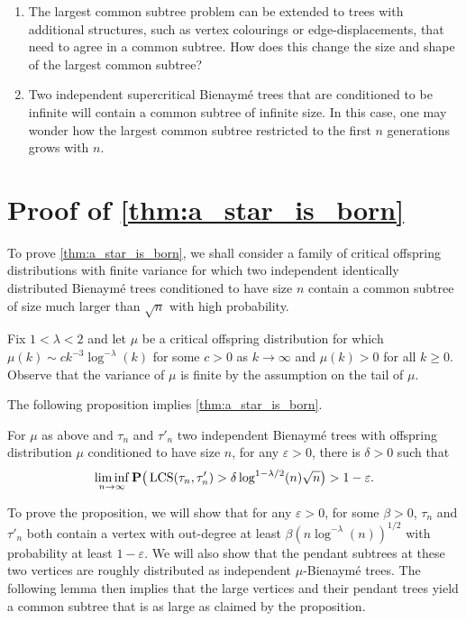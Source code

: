 \documentclass[11pt,reqno]{amsart}
\newcommand{\LCS}{\operatorname{LCS}}
\begin{document}
\begin{enumerate}
    \item The largest common subtree problem can be extended to trees with additional structures, such as vertex colourings or edge-displacements, that need to agree in a common subtree. How does this change the size and shape of the largest common subtree?
    \item Two independent supercritical Bienaymé trees that are conditioned to be infinite will contain a common subtree of infinite size. In this case, one may wonder how the largest common subtree restricted to the first $n$ generations grows with $n$.  
    
\end{enumerate}


\appendix
\section{Proof of \cref{thm:a_star_is_born}} \label{sec:a_star_is_born}

To prove \cref{thm:a_star_is_born}, we shall consider a family of critical offspring distributions with finite variance for which two independent identically distributed Bienaymé trees conditioned to have size $n$ contain a common subtree of size much larger than $\sqrt{n}$ with high probability.

Fix $1<\lambda<2$ and let $\mu$ be a critical offspring distribution for which $\mu(k)\sim ck^{-3}\log^{-\lambda}(k)$ for some $c>0$ as $k\to \infty$ and $\mu(k)>0$ for all $k\ge 0$. Observe that the variance of $\mu$ is finite by the assumption on the tail of $\mu$. 

The following proposition implies \cref{thm:a_star_is_born}.

\begin{prop}\label{prop:bigstar}
For $\mu$ as above and $\tau_n$ and $\tau'_n$ two independent Bienaymé trees with offspring distribution $\mu$ conditioned to have size $n$, for any $\varepsilon>0$,
there is $\delta>0$ such that
\[\liminf_{n\to\infty} \P\big(\LCS(\tau_n,\tau'_n)>\delta \log^{1-\lambda/2}(n)\sqrt{n}\big)>1-\varepsilon .\]
\end{prop}

To prove the proposition, we will show that for any $\varepsilon>0$, for some $\beta>0$, $\tau_n$ and $\tau'_n$ both contain a vertex with out-degree at least $\beta ({n\log^{-\lambda}(n)})^{1/2}$ with probability at least $1-\varepsilon$. We will also show that the pendant subtrees at these two vertices are roughly distributed as independent $\mu$-Bienaymé trees. The following lemma then implies that the large vertices and their pendant trees yield a common subtree that is as large as claimed by the proposition.
\end{document}
